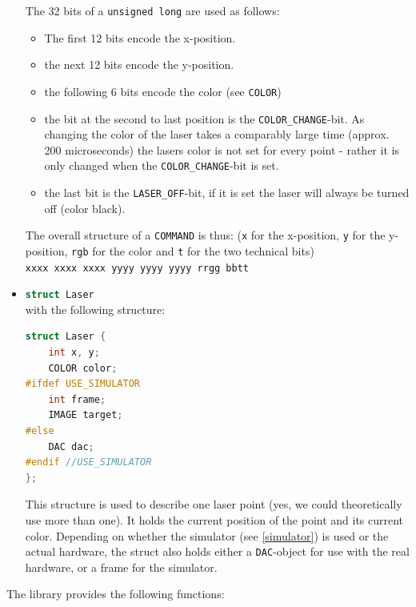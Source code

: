 \documentclass{report}
\begin{document}
\begin{itemize}
		The 32 bits of a \lstinline{unsigned long} are used as follows:
		\begin{itemize}
			\item The first 12 bits encode the x-position. 
			\item the next 12 bits encode the y-position. 
			\item the following 6 bits encode the color (see \lstinline{COLOR}) 
			\item the bit at the second to last position is the \lstinline{COLOR_CHANGE}-bit. 
				As changing the color of the laser takes a comparably large time (approx. 200 microseconds) the lasers color is not set for every point - rather it is only changed when the \lstinline{COLOR_CHANGE}-bit is set.
			\item the last bit is the \lstinline{LASER_OFF}-bit, if it is set the laser will always be turned off (color black). 
\end{itemize}
The overall structure of a \lstinline{COMMAND} is thus: (\lstinline{x} for the x-position, \lstinline{y} for the y-position, \lstinline{rgb} for the color and \lstinline{t} for the two technical bits) \\
\lstinline{xxxx xxxx xxxx yyyy yyyy yyyy rrgg bbtt}
	\item \lstinline[language=c++]{struct Laser}\\
		with the following structure: \\
\begin{lstlisting}[language=c++]
struct Laser {
    int x, y;
    COLOR color;
#ifdef USE_SIMULATOR
    int frame;
    IMAGE target;
#else
    DAC dac;
#endif //USE_SIMULATOR
};
\end{lstlisting} 
This structure is used to describe one laser point (yes, we could theoretically use more than one). It holds the current position of the point and its current color. Depending on whether the simulator (see \ref{simulator}) is used or the actual hardware, the struct also holds either a \lstinline[language=c++]{DAC}-object for use with the real hardware, or a frame for the simulator.
\end{itemize}
The library provides the following functions:
\end{document}
